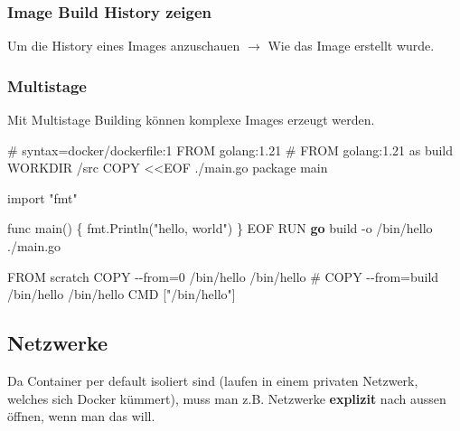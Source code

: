 \documentclass[
  10pt,
  a4paper,
  twocolumn]{article}
\newenvironment{Shaded}{}{}
\newcommand{\AttributeTok}[1]{\textcolor[rgb]{0.84,0.23,0.29}{#1}}
\newcommand{\CommentTok}[1]{\textcolor[rgb]{0.42,0.45,0.49}{#1}}
\newcommand{\CommentVarTok}[1]{\textcolor[rgb]{0.42,0.45,0.49}{#1}}
\newcommand{\ExtensionTok}[1]{\textcolor[rgb]{0.84,0.23,0.29}{\textbf{#1}}}
\newcommand{\KeywordTok}[1]{\textcolor[rgb]{0.84,0.23,0.29}{#1}}
\newcommand{\NormalTok}[1]{\textcolor[rgb]{0.14,0.16,0.18}{#1}}
\newcommand{\OperatorTok}[1]{\textcolor[rgb]{0.14,0.16,0.18}{#1}}
\newcommand{\StringTok}[1]{\textcolor[rgb]{0.01,0.18,0.38}{#1}}
\begin{document}
\subsubsection{Image Build History
zeigen}\label{image-build-history-zeigen}

Um die History eines Images anzuschauen \(\rightarrow\) Wie das Image
erstellt wurde.

\begin{Shaded}
\end{Shaded}

\subsubsection{Multistage}\label{multistage}

Mit Multistage Building können komplexe Images erzeugt werden.

\begin{Shaded}
\begin{Highlighting}[]
\CommentTok{\# }\CommentVarTok{syntax=docker/dockerfile:1}
\KeywordTok{FROM}\NormalTok{ golang:1.21}
\CommentTok{\# FROM golang:1.21 as build}
\KeywordTok{WORKDIR}\NormalTok{ /src}
\KeywordTok{COPY}\NormalTok{ \textless{}\textless{}EOF ./main.go}
\NormalTok{package main}

\NormalTok{import }\StringTok{"fmt"}

\NormalTok{func main() \{}
\NormalTok{  fmt.Println(}\StringTok{"hello, world"}\NormalTok{)}
\NormalTok{\}}
\NormalTok{EOF}
\KeywordTok{RUN} \ExtensionTok{go}\NormalTok{ build }\AttributeTok{{-}o}\NormalTok{ /bin/hello ./main.go}

\KeywordTok{FROM}\NormalTok{ scratch}
\KeywordTok{COPY} \OperatorTok{{-}{-}from=0}\NormalTok{ /bin/hello /bin/hello}
\CommentTok{\# COPY {-}{-}from=build /bin/hello /bin/hello}
\KeywordTok{CMD}\NormalTok{ [}\StringTok{"/bin/hello"}\NormalTok{]}
\end{Highlighting}
\end{Shaded}

\subsection{Netzwerke}\label{netzwerke}

Da Container per default isoliert sind (laufen in einem privaten
Netzwerk, welches sich Docker kümmert), muss man z.B. Netzwerke
\textbf{explizit} nach aussen öffnen, wenn man das will.
\end{document}
